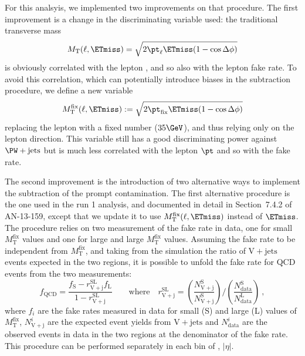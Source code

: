 For this analsyis, we implemented two improvements on that procedure. The first improvement is a change in the discriminating variable used: the traditional transverse mass
\[ M_\mathrm{T}(\ell,\ETmiss) = \sqrt{2 {\pt}_\ell \ETmiss (1-\cos\Delta\phi)} \]
is obviously correlated with the lepton \pt, and so also with the lepton fake rate. To avoid this correlation, which can potentially introduce biases in the subtraction procedure, we define a new variable
\[ M_\mathrm{T}^{\mathrm{fix}}(\ell,\ETmiss) := \sqrt{2 {\pt}_{\mathrm{fix}} \ETmiss (1-\cos\Delta\phi)} \]
replacing the lepton \pt with a fixed number ($35\GeV$), and thus relying only on the lepton direction. This variable still has a good discriminating power against $\PW+\mathrm{jets}$ but is much less correlated with the lepton $\pt$ and so with the fake rate.

The second improvement is the introduction of two alternative ways to implement the subtraction of the prompt contamination. The first alternative procedure is the one used in the run 1 analysis, and documented in detail in Section~7.4.2 of AN-13-159, except that we update it to use $M_\mathrm{T}^{\mathrm{fix}}(\ell,\ETmiss)$ instead of $\ETmiss$. The procedure relies on two measurement of the fake rate in data, one for small $M_\mathrm{T}^{\mathrm{fix}}$ values and one for 
large and large $M_\mathrm{T}^{\mathrm{fix}}$ values. Assuming the fake rate to be independent from $M_\mathrm{T}^{\mathrm{fix}}$, and taking from the simulation the ratio of $\mathrm{V}+\mathrm{jets}$ events expected in the two regions, it is possible to unfold the fake rate for QCD events from the two measurements:
\[ f_\mathrm{QCD}  = \frac{f_\mathrm{S} - r^\mathrm{SL}_\mathrm{V+j} f_\mathrm{L}}{1 - r^\mathrm{SL}_\mathrm{V+j}} \qquad 
    \text{where}\quad r^\mathrm{SL}_\mathrm{V+j} = \left(\frac{N^\mathrm{S}_\mathrm{V+j}}{N^\mathrm{S}_\mathrm{V+j}}\right) / \left(\frac{N^\mathrm{S}_\mathrm{data}}{N^\mathrm{L}_\mathrm{data}}\right)\ , \]
where $f_i$ are the fake rates measured in data for small (S) and large (L) values of $M_\mathrm{T}^{\mathrm{fix}}$, $N^i_\mathrm{V+j}$ are the expected event yields from $\mathrm{V}+\mathrm{jets}$ and $N^i_\mathrm{data}$ are the observed events in data in the two regions at the denominator of the fake rate. This procedure can be performed separately in each bin of \pt, $|\eta|$. 

